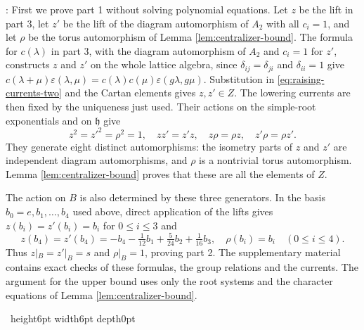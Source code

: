 \documentclass[leqno]{article}
\renewcommand{\leq}{\ensuremath{\leqslant}}
\newcommand{\qed}{\hfill \vrule height6pt  width6pt depth0pt}
\newcommand{\epsi}{\varepsilon}
\newenvironment{proof}[1][]{\noindent {\it Proof #1} : }{\hbox{~}\qed
\smallskip
}
\numberwithin{equation}{section}
\begin{document}
\begin{proof}
First we prove part 1 without solving polynomial equations. Let $z$ be the lift in part 3, let $z'$ be the lift of the diagram automorphism of $A_2$ with all $c_i = 1$, and let $\rho$ be the torus automorphism of Lemma \ref{lem:centralizer-bound}. The formula for $c(\lambda)$ in part 3, with the diagram automorphism of $A_2$ and $c_i = 1$ for $z'$, constructs $z$ and $z'$ on the whole lattice algebra, since $\delta_{ij} = \delta_{ji}$ and $\delta_{ii} = 1$ give $c(\lambda+\mu)\epsi(\lambda,\mu) = c(\lambda)c(\mu)\epsi(g\lambda,g\mu)$. Substitution in \eqref{eq:raising-currents-two} and the Cartan elements gives $z,z' \in Z$. The lowering currents are then fixed by the uniqueness just used. Their actions on the simple-root exponentials and on $\mathfrak h$ give
\[
z^2 = z'^2 = \rho^2 = 1, \quad zz' = z'z, \quad z\rho = \rho z, \quad z'\rho = \rho z'.
\]
They generate eight distinct automorphisms: the isometry parts of $z$ and $z'$ are independent diagram automorphisms, and $\rho$ is a nontrivial torus automorphism. Lemma \ref{lem:centralizer-bound} proves that these are all the elements of $Z$.

The action on $B$ is also determined by these three generators. In the basis $b_0 = e,b_1,\ldots,b_4$ used above, direct application of the lifts gives $z(b_i) = z'(b_i) = b_i$ for $0 \leq i \leq 3$ and
\[
z(b_4) = z'(b_4) = -b_4-\tfrac1{12}b_1+\tfrac5{24}b_2+\tfrac1{16}b_3,
\quad \rho(b_i) = b_i \quad (0 \leq i \leq 4).
\]
Thus $z|_B = z'|_B = s$ and $\rho|_B = 1$, proving part 2. The supplementary material contains exact checks of these formulas, the group relations and the currents. The argument for the upper bound uses only the root systems and the character equations of Lemma \ref{lem:centralizer-bound}.


\end{proof}
\end{document}
